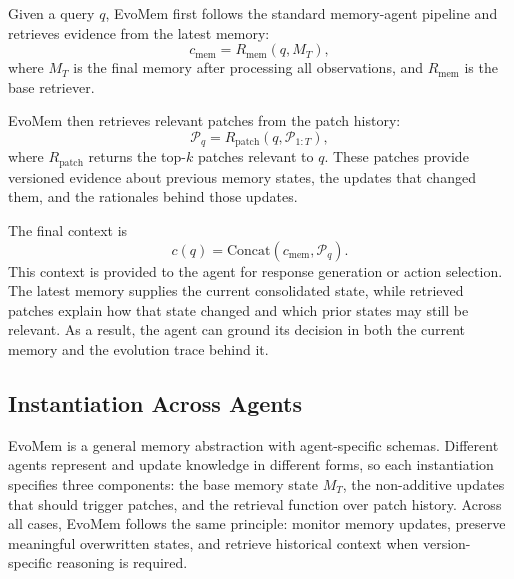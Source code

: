 \documentclass{article}
\begin{document}
Given a query $q$, EvoMem first follows the standard memory-agent pipeline and retrieves evidence from the latest memory:
\[
c_{\mathrm{mem}} = R_{\mathrm{mem}}(q, M_T),
\]
where $M_T$ is the final memory after processing all observations, and $R_{\mathrm{mem}}$ is the base retriever.

EvoMem then retrieves relevant patches from the patch history:
\[
\mathcal{P}_q = R_{\mathrm{patch}}(q, \mathcal{P}_{1:T}),
\]
where $R_{\mathrm{patch}}$ returns the top-$k$ patches relevant to $q$. These patches provide versioned evidence about previous memory states, the updates that changed them, and the rationales behind those updates.

The final context is
\[
c(q)=\mathrm{Concat}\left(c_{\mathrm{mem}}, \mathcal{P}_q\right).
\]
This context is provided to the agent for response generation or action selection. The latest memory supplies the current consolidated state, while retrieved patches explain how that state changed and which prior states may still be relevant. As a result, the agent can ground its decision in both the current memory and the evolution trace behind it.













\subsection{Instantiation Across Agents}
\label{sec:instantiation}

EvoMem is a general memory abstraction with agent-specific schemas. Different agents represent and update knowledge in different forms, so each instantiation specifies three components: the base memory state $M_T$, the non-additive updates that should trigger patches, and the retrieval function over patch history. Across all cases, EvoMem follows the same principle: monitor memory updates, preserve meaningful overwritten states, and retrieve historical context when version-specific reasoning is required.
\end{document}
